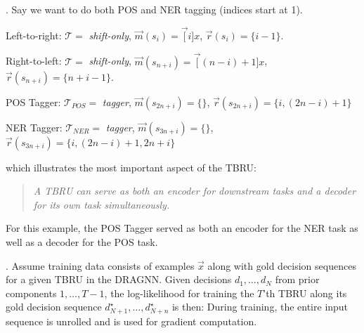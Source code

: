 \documentclass[11pt]{article}
\begin{document}
\myspace
\p {}. Say we want to do both POS and NER tagging (indices start at 1). 
\begin{compactitem}
	\item Left-to-right: $\mathcal{T} = $ \textit{shift-only}, $\vec{m}(s_i) = \vec[i]{x}$, $\vec{r}(s_i) = \{i - 1\}$. 
	\item Right-to-left: $\mathcal{T} =$ \textit{shift-only}, $\vec{m}(s_{n+i}) = \vec[(n-i)+1]{x}$, $\vec{r}(s_{n+i}) = \{n + i - 1\}$. 
	\item POS Tagger: $\mathcal{T}_{POS} =$ \textit{tagger}, $\vec{m}(s_{2n+i}) = \{\}$, $\vec{r}(s_{2n+i}) = \{i, (2n - i) + 1\}$
	\item NER Tagger: $\mathcal{T}_{NER} =$ \textit{tagger}, $\vec{m}(s_{3n+i}) = \{\}$, $\vec{r}(s_{3n+i}) = \{i, (2n - i) + 1, 2n + i \}$
\end{compactitem}
which illustrates the most important aspect of the TBRU:
\vspace{-0.8em}
\begin{quote}
	{\itshape 
		A TBRU can serve as both an encoder for downstream tasks and a decoder for its own task simultaneously.
	}
\end{quote}
For this example, the POS Tagger served as both an encoder for the NER task as well as a decoder for the POS task.

\myspace
\p {}. Assume training data consists of examples $\vec{x}$ along with gold decision sequences for a given TBRU in the DRAGNN. Given decisions $d_1, \ldots, d_N$ from prior components $1, \ldots, T-1$, the log-likelihood for training the $T$'th TBRU along its gold decision sequence $d_{N+1}^{\star}, \ldots, d_{N+n}^{\star}$ is then:
During training, the entire input sequence is unrolled and  is used for gradient computation.

\myspace{}
\end{document}
